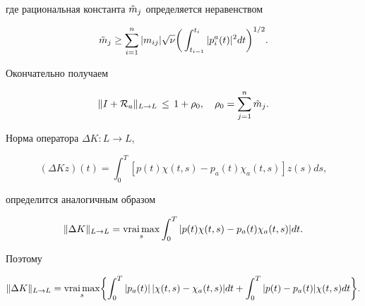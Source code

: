 %


где рациональная константа $\Tilde m_j$ определяется неравенством


%


$$


\Tilde m_j \ge \sum_{i=1}^{n} |m_{ij}| \sqrt{\nu} \biggl(\,


\int_{t_{i-1}}^{t_i} |p_i^a (t)|^2 dt \biggr) ^{1/2}.


$$


%


Окончательно получаем


%


\begin{equation}


\| I+{\cal R}_a \| _{L \to L} \, \le \, 1+\rho_0, \quad


\rho_0 = \sum_{j=1}^{n} \Tilde m_j.


\end{equation}





Норма оператора $\Delta K: L \to L$,


%


$$


(\Delta Kz) (t) = 


\int_0^T [ p(t)\chi(t,s) - p_a(t)\chi _a(t,s) ] z(s) ds,


$$


%


определится аналогичным образом


%


$$


\| \Delta K \| _{L \to L} = \vraimax_s \int_0^T


 | p(t)\chi(t,s) - p_a(t)\chi _a(t,s) | dt.


$$


%


Поэтому


%


\begin{equation}


\| \Delta K \| _{L \to L}


= \vraimax_s \biggl\{ \int_0^T


 | p_a(t)|\,|\chi(t,s) - \chi _a(t,s) | dt +


\int_0^T  | p(t) - p_a(t) | \chi(t,s) dt \biggr\}.


\end{equation}






